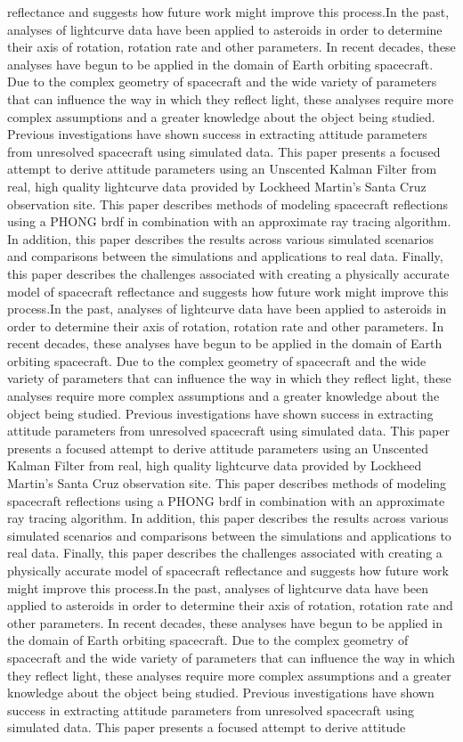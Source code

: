 reflectance and suggests how future work might improve this process.In the past, analyses of lightcurve data have been applied to asteroids in order to determine their axis of rotation, rotation rate and other parameters. In recent decades, these analyses have begun to be applied in the domain of Earth orbiting spacecraft. Due to the complex geometry of spacecraft and the wide variety of parameters that can influence the way in which they reflect light, these analyses require more complex assumptions and a greater knowledge about the object being studied. Previous investigations have shown success in extracting attitude parameters from unresolved spacecraft using simulated data. This paper presents a focused attempt to derive attitude parameters using an Unscented Kalman Filter from real, high quality lightcurve data provided by Lockheed Martin's Santa Cruz observation site. This paper describes methods of modeling spacecraft reflections using a PHONG brdf in combination with an approximate ray tracing algorithm. In addition, this paper describes the results across various simulated scenarios and comparisons between the simulations and applications to real data. Finally, this paper describes the challenges associated with creating a physically accurate model of spacecraft reflectance and suggests how future work might improve this process.In the past, analyses of lightcurve data have been applied to asteroids in order to determine their axis of rotation, rotation rate and other parameters. In recent decades, these analyses have begun to be applied in the domain of Earth orbiting spacecraft. Due to the complex geometry of spacecraft and the wide variety of parameters that can influence the way in which they reflect light, these analyses require more complex assumptions and a greater knowledge about the object being studied. Previous investigations have shown success in extracting attitude parameters from unresolved spacecraft using simulated data. This paper presents a focused attempt to derive attitude parameters using an Unscented Kalman Filter from real, high quality lightcurve data provided by Lockheed Martin's Santa Cruz observation site. This paper describes methods of modeling spacecraft reflections using a PHONG brdf in combination with an approximate ray tracing algorithm. In addition, this paper describes the results across various simulated scenarios and comparisons between the simulations and applications to real data. Finally, this paper describes the challenges associated with creating a physically accurate model of spacecraft reflectance and suggests how future work might improve this process.In the past, analyses of lightcurve data have been applied to asteroids in order to determine their axis of rotation, rotation rate and other parameters. In recent decades, these analyses have begun to be applied in the domain of Earth orbiting spacecraft. Due to the complex geometry of spacecraft and the wide variety of parameters that can influence the way in which they reflect light, these analyses require more complex assumptions and a greater knowledge about the object being studied. Previous investigations have shown success in extracting attitude parameters from unresolved spacecraft using simulated data. This paper presents a focused attempt to derive attitude 